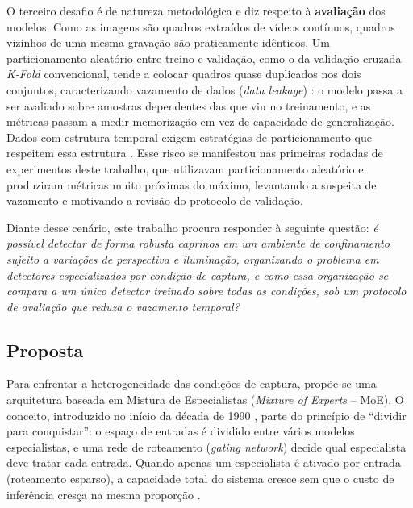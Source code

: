 \documentclass[12pt]{article}
\begin{document}
O terceiro desafio é de natureza metodológica e diz respeito à \textbf{avaliação} dos modelos. Como as imagens são quadros extraídos de vídeos contínuos, quadros vizinhos de uma mesma gravação são praticamente idênticos. Um particionamento aleatório entre treino e validação, como o da validação cruzada \textit{K-Fold} convencional, tende a colocar quadros quase duplicados nos dois conjuntos, caracterizando vazamento de dados (\textit{data leakage}) \cite{kaufman2012leakage}: o modelo passa a ser avaliado sobre amostras dependentes das que viu no treinamento, e as métricas passam a medir memorização em vez de capacidade de generalização. Dados com estrutura temporal exigem estratégias de particionamento que respeitem essa estrutura \cite{roberts2017crossvalidation}. Esse risco se manifestou nas primeiras rodadas de experimentos deste trabalho, que utilizavam particionamento aleatório e produziram métricas muito próximas do máximo, levantando a suspeita de vazamento e motivando a revisão do protocolo de validação.

Diante desse cenário, este trabalho procura responder à seguinte questão: \textit{é possível detectar de forma robusta caprinos em um ambiente de confinamento sujeito a variações de perspectiva e iluminação, organizando o problema em detectores especializados por condição de captura, e como essa organização se compara a um único detector treinado sobre todas as condições, sob um protocolo de avaliação que reduza o vazamento temporal?}

\subsection{Proposta}
\label{subsec:proposta}

Para enfrentar a heterogeneidade das condições de captura, propõe-se uma arquitetura baseada em Mistura de Especialistas (\textit{Mixture of Experts} -- MoE). O conceito, introduzido no início da década de 1990 \cite{jacobs1991adaptive}, parte do princípio de ``dividir para conquistar'': o espaço de entradas é dividido entre vários modelos especialistas, e uma rede de roteamento (\textit{gating network}) decide qual especialista deve tratar cada entrada. Quando apenas um especialista é ativado por entrada (roteamento esparso), a capacidade total do sistema cresce sem que o custo de inferência cresça na mesma proporção \cite{shazeer2017outrageously}.
\end{document}
